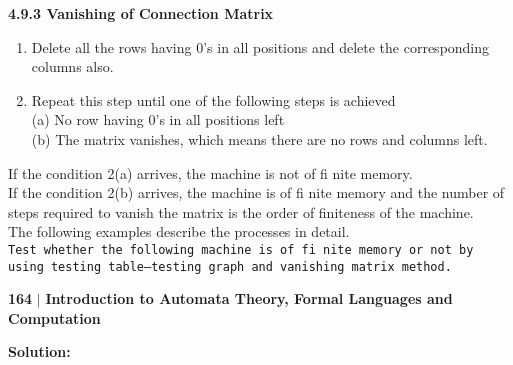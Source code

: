 \documentclass[10pt]{article}
\begin{document}
\vspace*{0.4cm}

\large{
\textbf{4.9.3 Vanishing of Connection Matrix}\\
}

\vspace*{0.2cm}

\begin{enumerate}
  \item Delete all the rows having 0’s in all positions and delete the corresponding columns also.\\
  \item Repeat this step until one of the following steps is achieved\\
(a) No row having 0’s in all positions left\\
(b) The matrix vanishes, which means there are no rows and columns left.\\
\end{enumerate}

\vspace*{0.2cm}
\hspace*{0.5cm} If the condition 2(a) arrives, the machine is not of fi nite memory.\\
\hspace*{0.5cm} If the condition 2(b) arrives, the machine is of fi nite memory and the number of steps required to
vanish the matrix is the order of finiteness of the machine.\\
\hspace*{0.5cm} The following examples describe the processes in detail.\\

\vspace*{0.2cm}
\hspace*{0.1cm} \texttt{Test whether the following machine is of fi nite memory or not by using testing
table–testing graph and vanishing matrix method.}\\


\newpage
 \begin{flushleft}
    \textbf{164}\hspace*{0.1cm} \textbf{$|$} \hspace*{0.1cm} {\tiny \textbf{Introduction to Automata Theory, Formal Languages and Computation}}
  \end{flushleft}
\vspace*{0.4cm}

\textbf{Solution:}\\
\end{document}
